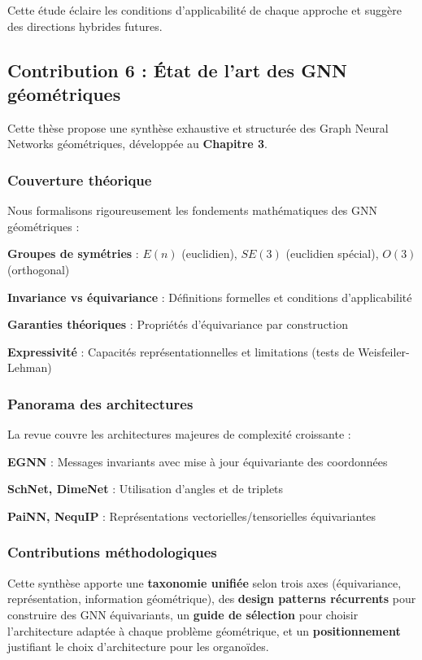 Cette étude éclaire les conditions d'applicabilité de chaque approche et suggère des directions hybrides futures.

\subsection{Contribution 6 : État de l'art des GNN géométriques}

Cette thèse propose une synthèse exhaustive et structurée des Graph Neural Networks géométriques, développée au \textbf{Chapitre 3}.

\subsubsection{Couverture théorique}

Nous formalisons rigoureusement les fondements mathématiques des GNN géométriques :

\textbf{Groupes de symétries} : $E(n)$ (euclidien), $SE(3)$ (euclidien spécial), $O(3)$ (orthogonal)

\textbf{Invariance vs équivariance} : Définitions formelles et conditions d'applicabilité

\textbf{Garanties théoriques} : Propriétés d'équivariance par construction

\textbf{Expressivité} : Capacités représentationnelles et limitations (tests de Weisfeiler-Lehman)

\subsubsection{Panorama des architectures}

La revue couvre les architectures majeures de complexité croissante :

\textbf{EGNN} : Messages invariants avec mise à jour équivariante des coordonnées

\textbf{SchNet, DimeNet} : Utilisation d'angles et de triplets

\textbf{PaiNN, NequIP} : Représentations vectorielles/tensorielles équivariantes

\subsubsection{Contributions méthodologiques}

Cette synthèse apporte une \textbf{taxonomie unifiée} selon trois axes (équivariance, représentation, information géométrique), des \textbf{design patterns récurrents} pour construire des GNN équivariants, un \textbf{guide de sélection} pour choisir l'architecture adaptée à chaque problème géométrique, et un \textbf{positionnement} justifiant le choix d'architecture pour les organoïdes.

